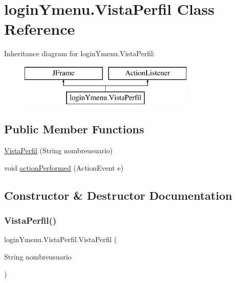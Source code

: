 \hypertarget{classlogin_ymenu_1_1_vista_perfil}{}\section{login\+Ymenu.\+Vista\+Perfil Class Reference}
\label{classlogin_ymenu_1_1_vista_perfil}
Inheritance diagram for login\+Ymenu.\+Vista\+Perfil\+:\begin{figure}[H]
\begin{center}
\leavevmode
\includegraphics[height=2.000000cm]{classlogin_ymenu_1_1_vista_perfil}
\end{center}
\end{figure}
\subsection*{Public Member Functions}
\begin{DoxyCompactItemize}
\item 
\mbox{\hyperlink{classlogin_ymenu_1_1_vista_perfil_a44ec94996fea900412f9c8908edbbf90}{Vista\+Perfil}} (String nombreusuario)
\item 
void \mbox{\hyperlink{classlogin_ymenu_1_1_vista_perfil_adb4604d96945449664fbaad9e608ad24}{action\+Performed}} (Action\+Event e)
\end{DoxyCompactItemize}


\subsection{Constructor \& Destructor Documentation}
\mbox{\label{classlogin_ymenu_1_1_vista_perfil_a44ec94996fea900412f9c8908edbbf90}} 
\subsubsection{\texorpdfstring{Vista\+Perfil()}{VistaPerfil()}}
{\footnotesize\ttfamily login\+Ymenu.\+Vista\+Perfil.\+Vista\+Perfil (\begin{DoxyParamCaption}\item[{String}]{nombreusuario }\end{DoxyParamCaption})}



